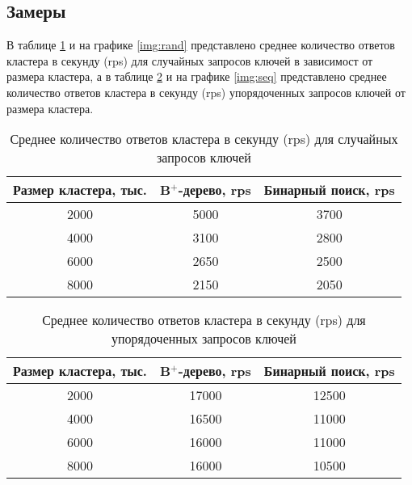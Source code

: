 \subsection{Замеры}

В таблице \ref{tab:rand} и на графике \ref{img:rand} представлено среднее количество ответов кластера в секунду (rps) для случайных запросов ключей в зависимост от размера кластера, а в таблице \ref{tab:seq} и на графике \ref{img:seq} представлено среднее количество ответов кластера в секунду (rps) упорядоченных запросов ключей от размера кластера.

\begin{table}[!h]
    \begin{center}
        \begin{tabular}{|c|c|c|}
            \hline
            Размер кластера, тыс. & B$^+$-дерево, rps & Бинарный поиск, rps \\
            \hline
            2000 & 5000 & 3700\\
            \hline
            4000 & 3100 & 2800\\
            \hline
            6000 & 2650 & 2500\\
            \hline
            8000 & 2150 & 2050\\
            \hline
        \end{tabular}
    \end{center}
    \caption{\label{tab:rand} Среднее количество ответов кластера в секунду (rps) для случайных запросов ключей}
\end{table}


\begin{table}[!h]
    \begin{center}
        \begin{tabular}{|c|c|c|}
            \hline
            Размер кластера, тыс. & B$^+$-дерево, rps & Бинарный поиск, rps \\
            \hline
            2000 & 17000 & 12500\\
            \hline
            4000 & 16500 & 11000\\
            \hline
            6000 & 16000 & 11000\\
            \hline
            8000 & 16000 & 10500\\
            \hline
        \end{tabular}
    \end{center}
    \caption{\label{tab:seq} Среднее количество ответов кластера в секунду (rps) для упорядоченных запросов ключей}
\end{table}

